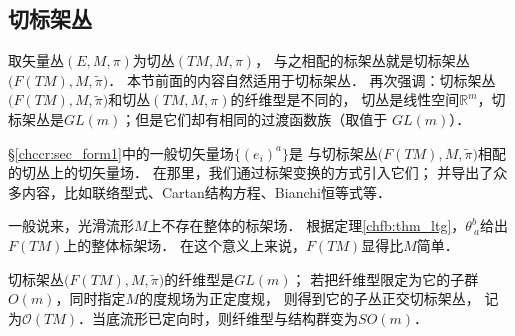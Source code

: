 







\subsection{切标架丛}\label{chfb:sec_tangent-frame-bundles}

取矢量丛$(E,M,\pi)$为切丛$(TM,M,\pi)$，
与之相配的标架丛就是切标架丛$\bigl(F(TM),M,\tilde{\pi}\bigr)$．
本节前面的内容自然适用于切标架丛．
再次强调：切标架丛$\bigl(F(TM),M,\tilde{\pi}\bigr)$和切丛$(TM,M,\pi)$的纤维型是不同的，
切丛是线性空间$\mathbb{R}^m$，切标架丛是$GL(m)$；但是它们却有相同的过渡函数族（取值于 $GL(m)$）．



\S\ref{chccr:sec_form1}中的一般切矢量场$\{(e_i)^a\}$是
与切标架丛$\bigl(F(TM),M,\tilde{\pi}\bigr)$相配的切丛上的切矢量场．
在那里，我们通过标架变换的方式引入它们；
并导出了众多内容，比如联络型式、Cartan结构方程、Bianchi恒等式等．

一般说来，光滑流形$M$上不存在整体的标架场．
根据定理\ref{chfb:thm_ltg}，$\theta^b_{\ a}$给出$F(TM)$上的整体标架场．
在这个意义上来说，$F(TM)$显得比$M$简单．


切标架丛$\bigl(F(TM),M,\tilde{\pi}\bigr)$的纤维型是$GL(m)$；
若把纤维型限定为它的子群$O(m)$，同时指定$M$的度规场为正定度规，
则得到它的子丛{\heiti 正交切标架丛}，
记为$\mathcal{O}(TM)$．当底流形已定向时，则纤维型与结构群变为$SO(m)$．

